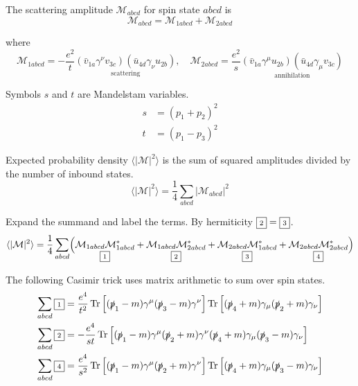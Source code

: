 The scattering amplitude $\mathcal M_{abcd}$ for spin state $abcd$ is
\begin{equation*}
\mathcal M_{abcd}=\mathcal M_{1abcd}+\mathcal M_{2abcd}
\end{equation*}

where
\begin{equation*}
\mathcal M_{1abcd}=-\frac{e^2}{t}
\underset{\text{scattering}}
{(\bar v_{1a}\gamma^\nu v_{3c})(\bar u_{4d}\gamma_\nu u_{2b})},
\quad
\mathcal M_{2abcd}=\frac{e^2}{s}
\underset{\text{annihilation}}
{(\bar v_{1a}\gamma^\mu u_{2b})(\bar u_{4d}\gamma_\mu v_{3c})}
\end{equation*}

Symbols $s$ and $t$ are Mandelstam variables.
\begin{align*}
s&=(p_1+p_2)^2
\\
t&=(p_1-p_3)^2
\end{align*}

Expected probability density $\langle|\mathcal M|^2\rangle$
is the sum of squared amplitudes divided by the number of inbound states.
\begin{equation*}
\langle|\mathcal M|^2\rangle=\frac{1}{4}\sum_{abcd}|\mathcal M_{abcd}|^2
\end{equation*}

Expand the summand and label the terms.
By hermiticity ${\scriptsize\boxed2}={\scriptsize\boxed3}$.
\begin{equation*}
\langle|\mathcal{M}|^2\rangle=\frac{1}{4}
\sum_{abcd}
\Bigl(
\underset{\scriptsize\boxed1}{\mathcal M_{1abcd}\mathcal M_{1abcd}^*}+
\underset{\scriptsize\boxed2}{\mathcal M_{1abcd}\mathcal M_{2abcd}^*}+
\underset{\scriptsize\boxed3}{\mathcal M_{2abcd}\mathcal M_{1abcd}^*}+
\underset{\scriptsize\boxed4}{\mathcal M_{2abcd}\mathcal M_{2abcd}^*}
\Bigr)
\end{equation*}

The following Casimir trick uses matrix arithmetic to sum over spin states.
\begin{align*}
\sum_{abcd}{\scriptsize\boxed1}
&=\frac{e^4}{t^2}\operatorname{Tr}\left[
(\slashed p_1-m)\gamma^\mu(\slashed p_3-m)\gamma^\nu
\right]
\operatorname{Tr}\left[
(\slashed p_4+m)\gamma_\mu(\slashed p_2+m)\gamma_\nu
\right]
\\
\sum_{abcd}{\scriptsize\boxed2}
&=-\frac{e^4}{st}\operatorname{Tr}\left[
(\slashed p_1-m)\gamma^\mu(\slashed p_2+m)\gamma^\nu
(\slashed p_4+m)\gamma_\mu(\slashed p_3-m)\gamma_\nu
\right]
\\
\sum_{abcd}{\scriptsize\boxed4}
&=\frac{e^4}{s^2}\operatorname{Tr}\left[
(\slashed p_1-m)\gamma^\mu(\slashed p_2+m)\gamma^\nu
\right]
\operatorname{Tr}\left[
(\slashed p_4+m)\gamma_\mu(\slashed p_3-m)\gamma_\nu
\right]
\end{align*}

